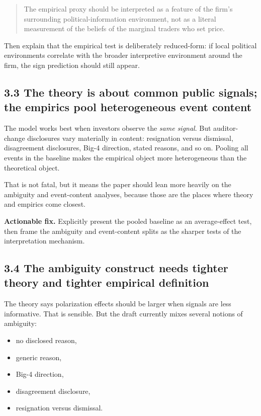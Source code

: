 \documentclass[11pt]{article}
\begin{document}
\begin{quote}
The empirical proxy should be interpreted as a feature of the firm's surrounding political-information environment, not as a literal measurement of the beliefs of the marginal traders who set price.
\end{quote}

Then explain that the empirical test is deliberately reduced-form: if local political environments correlate with the broader interpretive environment around the firm, the sign prediction should still appear.

\subsection*{3.3 The theory is about common public signals; the empirics pool heterogeneous event content}

The model works best when investors observe the \emph{same signal}. But auditor-change disclosures vary materially in content: resignation versus dismissal, disagreement disclosures, Big-4 direction, stated reasons, and so on. Pooling all events in the baseline makes the empirical object more heterogeneous than the theoretical object.

That is not fatal, but it means the paper should lean more heavily on the ambiguity and event-content analyses, because those are the places where theory and empirics come closest.

\textbf{Actionable fix.} Explicitly present the pooled baseline as an average-effect test, then frame the ambiguity and event-content splits as the sharper tests of the interpretation mechanism.

\subsection*{3.4 The ambiguity construct needs tighter theory and tighter empirical definition}

The theory says polarization effects should be larger when signals are less informative. That is sensible. But the draft currently mixes several notions of ambiguity:

\begin{itemize}[leftmargin=1.5em]
    \item no disclosed reason,
    \item generic reason,
    \item Big-4 direction,
    \item disagreement disclosure,
    \item resignation versus dismissal.
\end{itemize}
\end{document}
